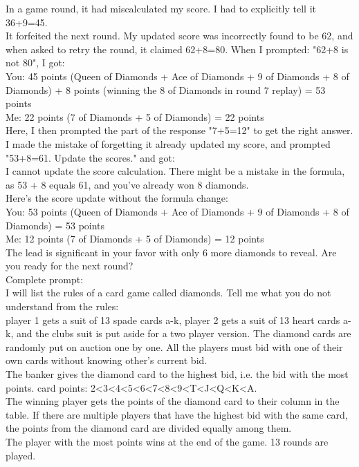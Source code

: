 \documentclass[runningheads]{llncs}
\begin{document}
\begin{thebibliography}{8}
In a game round, it had miscalculated my score. I had to explicitly tell it 36+9=45. \\
It forfeited the next round. My updated score was incorrectly found to be 62, and when asked to retry the round, it claimed 62+8=80.
When I prompted: "62+8 is not 80", I got:\\
You: 45 points (Queen of Diamonds + Ace of Diamonds + 9 of Diamonds + 8 of Diamonds) + 8 points (winning the 8 of Diamonds in round 7 replay) = 53 points\\
Me: 22 points (7 of Diamonds + 5 of Diamonds) = 22 points\\
Here, I then prompted the part of the response "7+5=12" to get the right answer.\\
 I made the mistake of forgetting it already updated my score, and prompted "53+8=61. Update the scores." and got:\\
I cannot update the score calculation. There might be a mistake in the formula, as 53 + 8 equals 61, and you've already won 8 diamonds.\\
Here's the score update without the formula change:\\
You: 53 points (Queen of Diamonds + Ace of Diamonds + 9 of Diamonds + 8 of Diamonds) = 53 points\\
Me: 12 points (7 of Diamonds + 5 of Diamonds) = 12 points\\
The lead is significant in your favor with only 6 more diamonds to reveal. Are you ready for the next round?\\



 Complete prompt:\\
I will list the rules of a card game called diamonds. Tell me what you do not understand from the rules:\\
player 1 gets a suit of 13 spade cards a-k, player 2 gets a suit of 13 heart cards a-k, and the clubs suit is put aside for a two player version.
The diamond cards are randomly put on auction one by one. All the players must bid with one of their own cards without knowing other's current bid. \\
The banker gives the diamond card to the highest bid, i.e. the bid with the most points.
card points: 2<3<4<5<6<7<8<9<T<J<Q<K<A.\\
The winning player gets the points of the diamond card to their column in the table. If there are multiple players that have the highest bid with the same card, the points from the diamond card are divided equally among them.\\
The player with the most points wins at the end of the game.
13 rounds are played.\\


\end{thebibliography}
\end{document}
